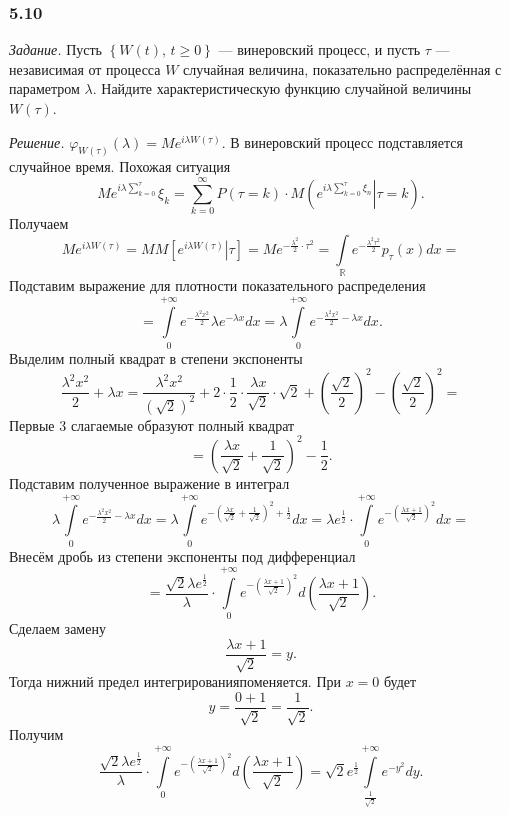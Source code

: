 \subsubsection*{5.10}

\textit{Задание.}
Пусть $ \left\{ W \left( t \right), \, t \geq 0 \right\} $ --- винеровский процесс,
и пусть $ \tau $ --- независимая от процесса $W$ случайная величина,
показательно распределённая с параметром $ \lambda $.
Найдите характеристическую функцию случайной величины $W \left( \tau \right) $.

\textit{Решение.}
$ \varphi_{W \left( \tau \right) } \left( \lambda \right) =
  Me^{i \lambda W \left( \tau \right) }$.
В винеровский процесс подставляется случайное время.
Похожая ситуация
$$Me^{i \lambda \sum \limits_{k = 0}^{ \tau }} \xi_k =
  \sum \limits_{k = 0}^{ \infty }
    P \left( \tau = k \right) \cdot
    M \left( \left. e^{i \lambda \sum \limits_{k = 0}^{ \tau } \xi_n} \right| \tau = k \right).$$
Получаем
$$Me^{i \lambda W \left( \tau \right) } =
  MM \left[ \left. e^{i \lambda W \left( \tau \right) } \right| \tau \right] =
  Me^{-\frac{ \lambda^2}{2} \cdot \tau^2 } =
  \int \limits_{ \mathbb{R}} e^{-\frac{ \lambda^2 \tau^2}{2}} p_{ \tau } \left( x \right) dx =$$
Подставим выражение для плотности показательного распределения
$$= \int \limits_0^{+\infty } e^{-\frac{ \lambda^2 x^2}{2}} \lambda e^{-\lambda x} dx =
  \lambda \int \limits_0^{+\infty } e^{-\frac{ \lambda^2 x^2}{2} - \lambda x} dx.$$
Выделим полный квадрат в степени экспоненты
$$ \frac{ \lambda^2 x^2}{2} + \lambda x =
  \frac{ \lambda^2 x^2}{ \left( \sqrt{2} \right)^2} +
  2 \cdot \frac{1}{2} \cdot \frac{ \lambda x}{ \sqrt{2}} \cdot \sqrt{2} +
  \left( \frac{ \sqrt{2}}{2} \right)^2 - \left( \frac{ \sqrt{2}}{2} \right)^2 =$$
Первые 3 слагаемые образуют полный квадрат
$$= \left( \frac{ \lambda x}{ \sqrt{2}} + \frac{1}{ \sqrt{2}} \right)^2 - \frac{1}{2}.$$
Подставим полученное выражение в интеграл
$$\lambda \int \limits_0^{+\infty } e^{-\frac{ \lambda^2 x^2}{2} - \lambda x} dx =
  \lambda \int \limits_0^{+\infty }
    e^{-\left( \frac{ \lambda x}{ \sqrt{2}} + \frac{1}{ \sqrt{2}} \right)^2 + \frac{1}{2}} dx =
  \lambda e^{ \frac{1}{2}} \cdot
  \int \limits_0^{+ \infty } e^{-\left( \frac{ \lambda x + 1}{ \sqrt{2}} \right)^2} dx =$$
Внесём дробь из степени экспоненты под дифференциал
$$= \frac{ \sqrt{2} \lambda e^{ \frac{1}{2}}}{ \lambda } \cdot
  \int \limits_0^{+\infty }
    e^{-\left( \frac{ \lambda x + 1}{ \sqrt{2}} \right)^2}
  d \left( \frac{ \lambda x + 1}{ \sqrt{2}} \right).$$
Сделаем замену
$$ \frac{ \lambda x + 1}{ \sqrt{2}} =
  y.$$
Тогда нижний предел интегрированияпоменяется.
При $x = 0$ будет
$$y =
  \frac{0 + 1}{ \sqrt{2}} =
  \frac{1}{ \sqrt{2}}.$$
Получим
$$ \frac{ \sqrt{2} \lambda e^{ \frac{1}{2}}}{ \lambda } \cdot
  \int \limits_0^{+\infty }
    e^{-\left( \frac{ \lambda x + 1}{ \sqrt{2}} \right)^2}
  d \left( \frac{ \lambda x + 1}{ \sqrt{2}} \right) =
  \sqrt{2} e^{ \frac{1}{2}} \int \limits_{ \frac{1}{ \sqrt{2}}}^{+\infty } e^{-y^2} dy.$$

